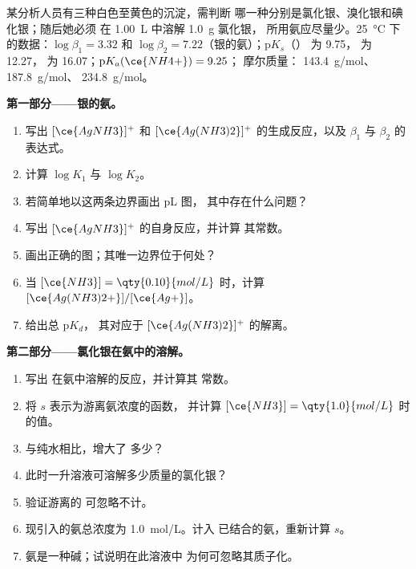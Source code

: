 \begin{problem}
\label{pb:b1:complexation:1}
某分析人员有三种白色至黄色的沉淀，需判断
哪一种分别是氯化银、溴化银和碘化银；随后她必须
在 \qty{1.00}{L} 中溶解 \qty{1.0}{g} 氯化银，
所用氨应尽量少。\qty{25}{\celsius} 下的数据：$\log\beta_1 = 3.32$ 和
$\log\beta_2 = 7.22$（银的氨）；$\mathrm{p}K_s$（）
为 9.75， 为 12.27， 为 16.07；$\mathrm{p}K_a(\ce{NH4+}) = 9.25$；
摩尔质量： \qty{143.4}{g/mol}、 \qty{187.8}{g/mol}、
 \qty{234.8}{g/mol}。

\medskip
\noindent\textbf{第一部分——银的氨。}
\begin{enumerate}
  \item 写出 $[\ce{AgNH3}]^{+}$ 和
        $[\ce{Ag(NH3)2}]^{+}$ 的生成反应，以及 $\beta_1$ 与 $\beta_2$ 的表达式。
  \item 计算 $\log K_1$ 与 $\log K_2$。
  \item 若简单地以这两条边界画出 pL 图，
        其中存在什么问题？
  \item 写出 $[\ce{AgNH3}]^{+}$ 的自身反应，并计算
        其常数。
  \item 画出正确的图；其唯一边界位于何处？
  \item 当 $[\ce{NH3}] = \qty{0.10}{mol/L}$ 时，计算
        $[\ce{Ag(NH3)2+}]/[\ce{Ag+}]$。
  \item 给出总 $\mathrm{p}K_d$，
        其对应于 $[\ce{Ag(NH3)2}]^{+}$ 的解离。
\end{enumerate}

\medskip
\noindent\textbf{第二部分——氯化银在氨中的溶解。}
\begin{enumerate}[resume]
  \item 写出  在氨中溶解的反应，并计算其
        常数。
  \item 将 $s$ 表示为游离氨浓度的函数，
        并计算 $[\ce{NH3}] = \qty{1.0}{mol/L}$ 时的值。
  \item 与纯水相比，增大了
        多少？
  \item 此时一升溶液可溶解多少质量的氯化银？
  \item 验证游离的  可忽略不计。
  \item 现引入的氨总浓度为 \qty{1.0}{mol/L}。计入
        已结合的氨，重新计算 $s$。
  \item 氨是一种碱；试说明在此溶液中
        为何可忽略其质子化。
\end{enumerate}


\end{problem}
